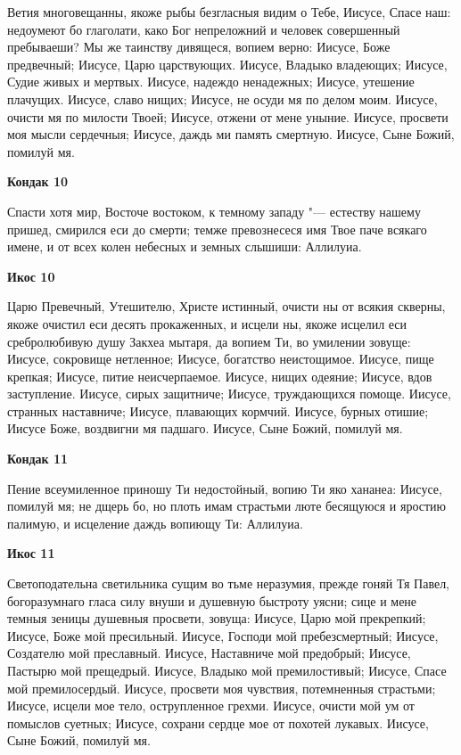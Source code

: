 Ветия многовещанны, якоже рыбы безгласныя видим о Тебе, Иисусе, Спасе наш: недоумеют бо глаголати, како Бог непреложний и человек совершенный пребываеши? Мы же таинству дивящеся, вопием верно: Иисусе, Боже предвечный; Иисусе, Царю царствующих. Иисусе, Владыко владеющих; Иисусе, Судие живых и мертвых. Иисусе, надеждо ненадежных; Иисусе, утешение плачущих. Иисусе, славо нищих; Иисусе, не осуди мя по делом моим. Иисусе, очисти мя по милости Твоей; Иисусе, отжени от мене уныние. Иисусе, просвети моя мысли сердечныя; Иисусе, даждь ми память смертную. Иисусе, Сыне Божий, помилуй мя.


\medskip


\bfseries Кондак 10\normalfont{}


Спасти хотя мир, Восточе востоком, к темному западу "--- естеству нашему пришед, смирился еси до смерти; темже превознесеся имя Твое паче всякаго имене, и от всех колен небесных и земных слышиши: Аллилуиа.


\medskip


\bfseries Икос 10\normalfont{}


Царю Превечный, Утешителю, Христе истинный, очисти ны от всякия скверны, якоже очистил еси десять прокаженных, и исцели ны, якоже исцелил еси сребролюбивую душу Закхеа мытаря, да вопием Ти, во умилении зовуще: Иисусе, сокровище нетленное; Иисусе, богатство неистощимое. Иисусе, пище крепкая; Иисусе, питие неисчерпаемое. Иисусе, нищих одеяние; Иисусе, вдов заступление. Иисусе, сирых защитниче; Иисусе, труждающихся помоще. Иисусе, странных наставниче; Иисусе, плавающих кормчий. Иисусе, бурных отишие; Иисусе Боже, воздвигни мя падшаго. Иисусе, Сыне Божий, помилуй мя.


\medskip


\bfseries Кондак 11\normalfont{}


Пение всеумиленное приношу Ти недостойный, вопию Ти яко хананеа: Иисусе, помилуй мя; не дщерь бо, но плоть имам страстьми люте бесящуюся и яростию палимую, и исцеление даждь вопиющу Ти: Аллилуиа.


\medskip


\bfseries Икос 11\normalfont{}


Светоподательна светильника сущим во тьме неразумия, прежде гоняй Тя Павел, богоразумнаго гласа силу внуши и душевную быстроту уясни; сице и мене темныя зеницы душевныя просвети, зовуща: Иисусе, Царю мой прекрепкий; Иисусе, Боже мой пресильный. Иисусе, Господи мой пребезсмертный; Иисусе, Создателю мой преславный. Иисусе, Наставниче мой предобрый; Иисусе, Пастырю мой прещедрый. Иисусе, Владыко мой премилостивый; Иисусе, Спасе мой премилосердый. Иисусе, просвети моя чувствия, потемненныя страстьми; Иисусе, исцели мое тело, острупленное грехми. Иисусе, очисти мой ум от помыслов суетных; Иисусе, сохрани сердце мое от похотей лукавых. Иисусе, Сыне Божий, помилуй мя.


